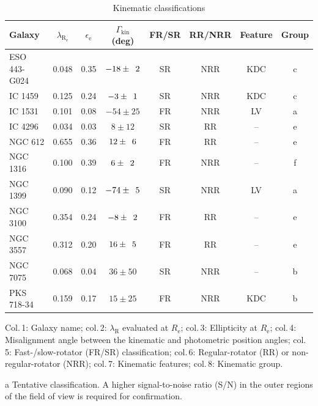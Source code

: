 		\begin{table}
			\centering
		\begin{threeparttable}
			\caption{Kinematic classifications}
			\label{tab:classify}
			\begin{tabular}{l c c c c c c c}
				\hline
				\hline
				Galaxy		& $\lambda_\mathrm{R_e}$ & $\epsilon_\mathrm{e}$  & $\Gamma_\text{kin}$ (deg) & FR/SR 	& RR/NRR 	& Feature & Group 	\\
				\hline 
				ESO 443-G024 & 0.048 & 0.35 & $-18\pm\leavevmode\phantom{0}2$	& SR & NRR & KDC & c \\
				IC 1459 	& 0.125 & 0.24 & \leavevmode\phantom{0}$-3\pm\leavevmode\phantom{0}1$ & SR & NRR & KDC & c \\
				IC 1531 	& 0.101 & 0.08 & $-54\pm25$	& FR & NRR & LV & a \\
				IC 4296		& 0.034 & 0.03 & \leavevmode\phantom{$-0$}$8\pm12$ & SR &\leavevmode\phantom{N}RR & -- & e \\
				NGC 612 	& 0.655 & 0.36 & \leavevmode\phantom{$-$}$12\pm\leavevmode\phantom{0}6$	& FR &\leavevmode\phantom{N}RR & -- & e \\
				NGC 1316 	& 0.100 & 0.39 & \leavevmode\phantom{$-0$}$6\pm\leavevmode\phantom{0}2$ & FR & NRR & -- & f \\
				NGC 1399 	& 0.090 & 0.12 & $-74\pm\leavevmode\phantom{0}5$ & SR & NRR & LV & a \\
				NGC 3100 	& 0.354 & 0.24 & \leavevmode\phantom{0}$-8\pm\leavevmode\phantom{0}2$ & FR &\leavevmode\phantom{N}RR & -- & e \\
				NGC 3557 	& 0.312 & 0.20 & \leavevmode\phantom{$-$}$16\pm\leavevmode\phantom{0}5$ & FR &\leavevmode\phantom{N}RR & -- & e\\
				NGC 7075 	& 0.068 & 0.04 & \leavevmode\phantom{$-$}$36\pm50$ & SR & NRR & -- & b \\
				PKS 718-34  & 0.159 & 0.17 & \leavevmode\phantom{$-$}$15\pm25$ & FR & NRR & KDC\tnote{a} & b\\
				\hline
				\hline
			\end{tabular}
			\begin{tablenotes}
			\footnotesize
			\note Col.\,1: Galaxy name; col.\,2: $\lambda_\mathrm{R}$ evaluated at $R_\mathrm{e}$; col.\,3: Ellipticity at $R_\mathrm{e}$; col.\,4: Misalignment angle between the kinematic and photometric position angles; col.\,5: Fast-/slow-rotator (FR/SR) classification; col.\,6: Regular-rotator (RR) or non-regular-rotator (NRR); col.\,7: Kinematic features; col.\,8: Kinematic group.
			\item [a] Tentative classification. A higher signal-to-noise ratio (S/N) in the outer regions of the field of view is required for confirmation.
			\end{tablenotes}
		\end{threeparttable}
		\end{table}

